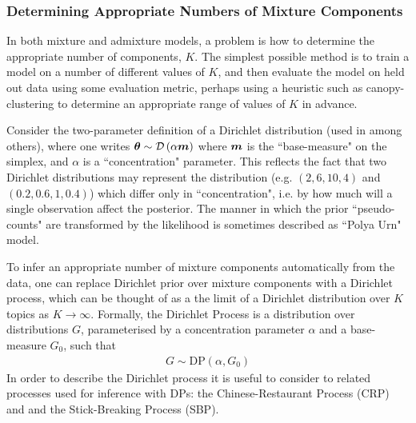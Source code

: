 

\subsubsection{Determining Appropriate Numbers of Mixture Components}
\label{sec:DPs}
In both mixture and admixture models, a problem is how to determine the appropriate number of components, $K$. The simplest possible method is to train a model on a number of different values of $K$, and then evaluate the model on held out data using some evaluation metric, perhaps using a heuristic such as canopy-clustering\cite{McCallum2000} to determine an appropriate range of values of $K$ in advance.


Consider the two-parameter definition of a Dirichlet distribution (used in \cite{MacKay1995}\cite{Wallach2006}\cite{Wallach2009a} among others), where one writes $\bm \theta \sim \mathcal{D} \left( {\alpha \bm m} \right)$ where $\bm m$ is the ``base-measure" on the simplex, and $\alpha$ is a ``concentration" parameter. This reflects the fact that two Dirichlet distributions may represent the distribution (e.g. $(2, 6, 10, 4)$ and $(0.2, 0.6, 1, 0.4)$) which differ only in ``concentration", i.e. by how much will a single observation affect the posterior. The manner in which the prior ``pseudo-counts" are transformed by the likelihood is sometimes described as ``Polya Urn" model.


To infer an appropriate number of mixture components automatically from the data, one can replace Dirichlet prior over mixture components with a Dirichlet process, which can be thought of as a the limit of a Dirichlet distribution over $K$ topics as $K \rightarrow \infty$. Formally, the Dirichlet Process is a distribution over distributions $G$, parameterised by a concentration parameter $\alpha$ and a base-measure $G_0$, such that
\begin{align*}
G \sim \text{DP}\left(\alpha, G_0\right)
\end{align*}
In order to describe the Dirichlet process it is useful to consider to related processes used for inference with DPs: the Chinese-Restaurant Process (CRP) and and the Stick-Breaking Process (SBP).


